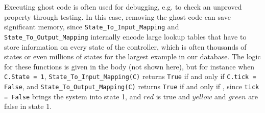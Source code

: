 \documentclass[runningheads]{llncs}
\begin{document}
Executing ghost code is often used for debugging, e.g. to check an unproved property through testing. 
In this case, removing the ghost code can save significant memory, 
since \lstinline{State_To_Input_Mapping} and \lstinline{State_To_Output_Mapping} 
internally encode large lookup tables that have to store information on every state of the controller, 
which is often thousands of states or even millions of states for the largest example in our database.
The logic for these functions is given in the body (not shown here), but for instance when \lstinline{C.State = 1}, 
\lstinline{State_To_Input_Mapping(C)} returns \lstinline{True} if and only if \lstinline{C.tick = False}, and 
\lstinline{State_To_Output_Mapping(C)} returns \lstinline{True} if and only if 
, 
since \lstinline{tick = False} brings the system into state 1, and $red$ is true and $yellow$ and $green$ are false in state 1.
 
\end{document}
